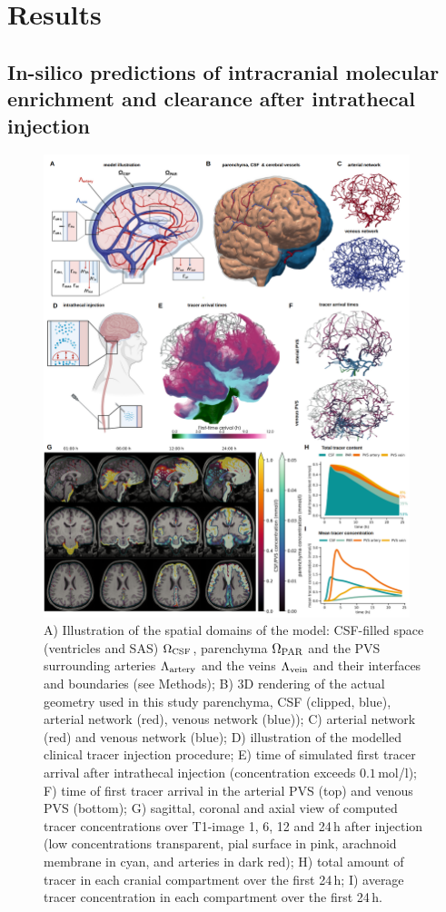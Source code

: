 \documentclass[fleqn,10pt]{wlscirep}
\begin{document}
\section*{Results}

\subsection*{In-silico predictions of intracranial molecular enrichment and clearance after intrathecal injection}
\begin{figure}
    \centering
    \includegraphics[width=0.95\textwidth]{figures/figure1.png}
     \caption{A) Illustration of the spatial domains of the model: CSF-filled space (ventricles and SAS) $\Omega_{\rm CSF}$, parenchyma $\Omega_{\rm PAR}$ and the PVS surrounding arteries $\Lambda_{\rm artery}$ and the veins $\Lambda_{\rm vein}$ and their interfaces and boundaries (see Methods); B) 3D rendering of the actual geometry used in this study parenchyma, CSF (clipped, blue), arterial network (red), venous network (blue)); C) arterial network (red) and venous network (blue); D) illustration of the modelled clinical tracer injection procedure; E) time of simulated first tracer arrival after intrathecal injection (concentration exceeds $0.1\,$mol/l); F) time of first tracer arrival in the arterial PVS (top) and venous PVS (bottom); G) sagittal, coronal and axial view of computed tracer concentrations over T1-image 1, 6, 12 and 24\,h after injection (low concentrations transparent, pial surface in pink, arachnoid membrane in cyan, and arteries in dark red); H) total amount of tracer in each cranial compartment over the first 24\,h; I) average tracer concentration in each compartment over the first 24\,h. }
     \label{fig:results1}
\end{figure}
\end{document}
